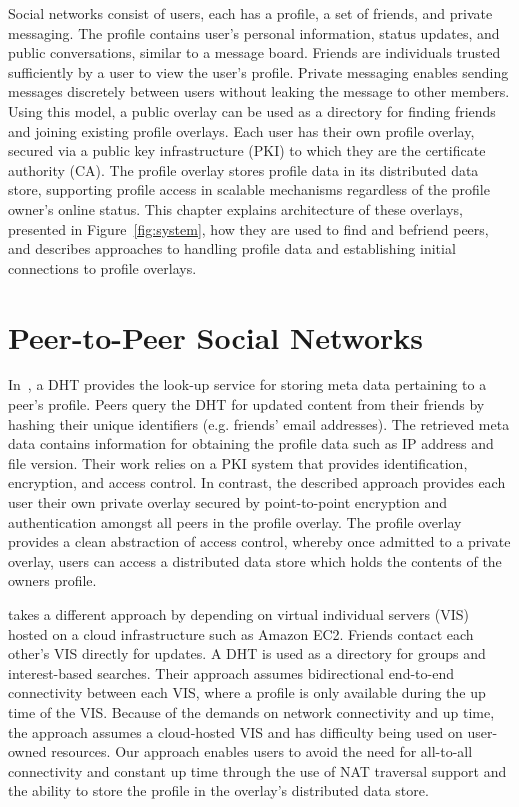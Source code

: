 Social networks consist of users, each has a profile, a set of friends, and
private messaging.  The profile contains user's personal information, status
updates, and public conversations, similar to a message board.  Friends are
individuals trusted sufficiently by a user to view the user's profile.  Private
messaging enables sending messages discretely between users without leaking the
message to other members.  Using this model, a public overlay can be used as a
directory for finding friends and joining existing profile overlays.  Each user
has their own profile overlay, secured via a public key infrastructure (PKI) to
which they are the certificate authority (CA).  The profile overlay stores
profile data in its distributed data store, supporting profile access in
scalable mechanisms regardless of the profile owner's online status.  This
chapter explains architecture of these overlays, presented in
Figure~\ref{fig:system}, how they are used to find and befriend peers, and
describes approaches to handling profile data and establishing initial
connections to profile overlays.

\section{Peer-to-Peer Social Networks}
In~\cite{peerson}, a DHT provides the look-up service for storing meta data
pertaining to a peer's profile. Peers query the DHT for updated content from 
their friends by hashing their unique identifiers (e.g. friends' email
addresses).  The retrieved meta data contains information for obtaining the
profile data such as IP address and file version. Their work relies
on a PKI system that provides identification, encryption, and access control.
In contrast, the described approach provides each user their own private
overlay secured by point-to-point encryption and authentication amongst all
peers in the profile overlay.  The profile overlay provides a clean abstraction
of access control, whereby once admitted to a private overlay, users can access
a distributed data store which holds the contents of the owners profile.

\cite{vis-a-vis} takes a different approach by depending on virtual individual
servers (VIS) hosted on a cloud infrastructure such as Amazon EC2. Friends
contact each other's VIS directly for updates.  A DHT is used as a directory for
groups and interest-based searches. Their approach assumes bidirectional
end-to-end connectivity between each VIS, where a profile is only available
during the up time of the VIS.  Because of the demands on network connectivity
and up time, the approach assumes a cloud-hosted VIS and has difficulty being used on user-owned resources.
Our approach enables users to avoid the need for all-to-all connectivity and
constant up time through the use of NAT traversal support and the
ability to store the profile in the overlay's distributed data store.


